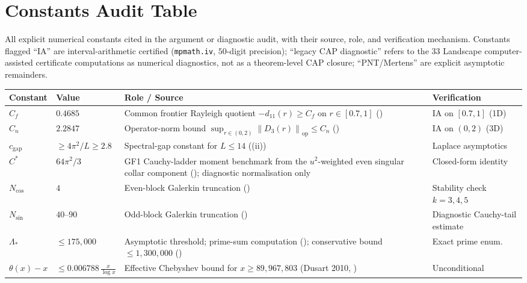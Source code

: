 \documentclass[11pt,a4paper]{article}
\theoremstyle{remark}
\theoremstyle{plain}
\newcommand{\norm}[1]{\left\lVert #1 \right\rVert}
\begin{document}
\appendix

\section{Constants Audit Table}
\label{sec:constants-audit}

All explicit numerical constants cited in the argument or diagnostic audit, with
their source, role, and verification mechanism. Constants flagged ``IA'' are
interval-arithmetic certified (\texttt{mpmath.iv}, $50$-digit precision);
``legacy CAP diagnostic'' refers to the $33$ Landscape computer-assisted
certificate computations as numerical diagnostics, not as a theorem-level CAP
closure; ``PNT/Mertens'' are explicit asymptotic remainders.

\begin{center}
\footnotesize
\renewcommand{\arraystretch}{1.25}
\begin{tabular}{L{2.6cm}|L{2.0cm}|L{6.2cm}|L{2.6cm}}
\textbf{Constant} & \textbf{Value} & \textbf{Role / Source} & \textbf{Verification} \\\hline
$C_f$ & $0.4685$ & Common frontier Rayleigh quotient $-d_{11}(r)\geq C_f$ on $r\in[0.7,1]$ () & IA on $[0.7,1]$ (1D)\\
$C_n$ & $2.2847$ & Operator-norm bound $\sup_{r\in(0,2)}\norm{D_3(r)}_{\mathrm{op}}\leq C_n$ () & IA on $(0,2)$ (3D)\\
$c_{\mathrm{gap}}$ & $\geq 4\pi^2/L\geq 2.8$ & Spectral-gap constant for $L\leq 14$ ((ii)) & Laplace asymptotics\\
$C^*$ & $64\pi^2/3$ & GF1 Cauchy-ladder moment benchmark from the \(u^2\)-weighted even singular collar component (); diagnostic normalisation only & Closed-form identity\\
$N_{\cos}$ & $4$ & Even-block Galerkin truncation () & Stability check $k=3,4,5$\\
$N_{\sin}$ & $40$--$90$ & Odd-block Galerkin truncation () & Diagnostic Cauchy-tail estimate\\
$\Lambda_*$ & $\leq 175{,}000$ & Asymptotic threshold; prime-sum computation (); conservative bound $\leq 1{,}300{,}000$ () & Exact prime enum.\\
$\theta(x)-x$ & $\leq 0.006788\,\tfrac{x}{\log x}$ & Effective Chebyshev bound for $x\geq 89{,}967{,}803$ (Dusart 2010, \cite{Dusart2010}) & Unconditional\\

\end{tabular}
\end{center}
\end{document}

